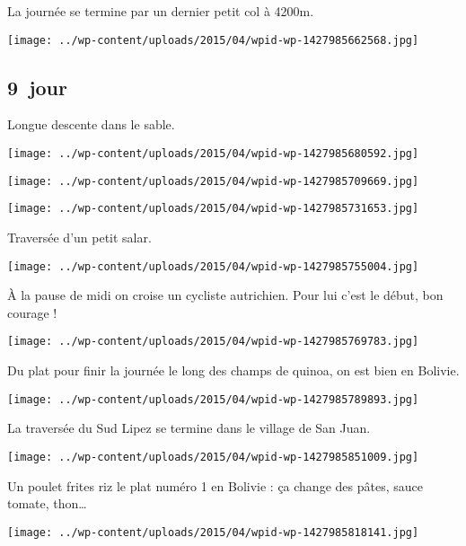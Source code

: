 \pagebreak
 La journée se termine par un dernier petit col à 4200m.
\begin{center} \texttt{[image: ../wp-content/uploads/2015/04/wpid-wp-1427985662568.jpg]} \end{center}

 \subsection*{9\ieme\ jour} 

 Longue descente dans le sable.
\begin{center} \texttt{[image: ../wp-content/uploads/2015/04/wpid-wp-1427985680592.jpg]} \end{center}
\begin{center} \texttt{[image: ../wp-content/uploads/2015/04/wpid-wp-1427985709669.jpg]} \end{center}
\begin{center} \texttt{[image: ../wp-content/uploads/2015/04/wpid-wp-1427985731653.jpg]} \end{center}

\pagebreak
 Traversée d'un petit salar.
\begin{center} \texttt{[image: ../wp-content/uploads/2015/04/wpid-wp-1427985755004.jpg]} \end{center}

 À la pause de midi on croise un cycliste autrichien. Pour lui c'est le début, bon courage !
\begin{center} \texttt{[image: ../wp-content/uploads/2015/04/wpid-wp-1427985769783.jpg]} \end{center}

\pagebreak
 Du plat pour finir la journée le long des champs de quinoa, on est bien en Bolivie.
\begin{center} \texttt{[image: ../wp-content/uploads/2015/04/wpid-wp-1427985789893.jpg]} \end{center}

 La traversée du Sud Lipez se termine dans le village de San Juan.
\begin{center} \texttt{[image: ../wp-content/uploads/2015/04/wpid-wp-1427985851009.jpg]} \end{center}

\pagebreak
 Un poulet frites riz le plat numéro 1 en Bolivie : ça change des pâtes, sauce tomate, thon…
\begin{center} \texttt{[image: ../wp-content/uploads/2015/04/wpid-wp-1427985818141.jpg]} \end{center}
